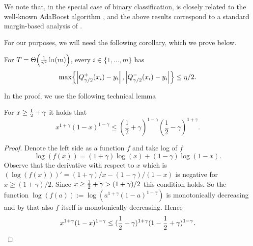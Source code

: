\documentclass[12pt,a4paper,oneside,onecolumn]{book}
\begin{document}
We note that, in the special case of binary classification, 
is closely related to the well-known AdaBoost algorithm
\citep{FreundSchapire97}, 
and the above results correspond to a
standard
margin-based analysis of
\citet{MR1673273}.

    

For our purposes, we will need the following corollary,
which we prove below.

\begin{corollary}
\label{cor:kegl-T-size}
For $T = \Theta\!\left(\frac{1}{\gamma^{2}} \ln(m)\right)$, 
every $i \in \{1,\ldots,m\}$ has 
\begin{equation*}
\max\!\left\{ \left| Q_{\gamma/2}^{+}(x_{i}) - y_{i} \right|, \left| Q_{\gamma/2}^{-}(x_{i}) - y_{i} \right| \right\} \leq \eta/2.
\end{equation*}
\end{corollary}

In the proof, we use the following technical lemma

\begin{lemma}
  \label{lem:cor-tech-kegl}
  For $x \geq \frac{1}{2} + \gamma$ it holds that
  \[
    x^{1+\gamma} (1-x)^{1-\gamma}
    \leq
    \left(\frac{1}{2} + \gamma\right)^{1-\gamma}
    \left(\frac{1}{2} - \gamma\right)^{1+\gamma}
    .
  \]
\end{lemma}

\begin{proof}
  Denote the left side as a function $f$
  and take log of $f$ 
  \[
    \log(f(x)) = (1+\gamma)\log(x) + (1-\gamma)\log(1-x).
  \]
  Observe that the derivative with respect to $x$ which is
  $(\log(f(x)))' = (1+\gamma)/x - (1-\gamma)/(1-x)$
  is negative for
  $x \geq (1+\gamma)/2$.
  Since
  $x \geq \frac{1}{2} + \gamma > (1+\gamma)/2$
  this condition holds.
  So the function
  $\log(f(a)) := \log\left(a^{1+\gamma} (1-a)^{1-\gamma}\right)$
  is monotonically decreasing
  and by that also $f$ itself is monotonically decreasing.
  Hence
  \begin{align*}
    x^{1+\gamma} (1-x)^{1-\gamma}
    \leq
    (\frac{1}{2} + \gamma)^{1+\gamma}
    (1 - \frac{1}{2} + \gamma)^{1-\gamma}
    .
  \end{align*}

\end{proof}
\end{document}
